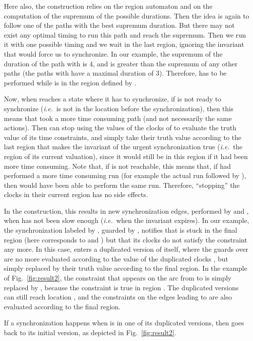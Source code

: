 \documentclass{LMCS}
\theoremstyle{plain}\newtheorem*{prop11}{Proposition~\ref{prop:states} bis}
\def\ie{{\em i.e.\ }}
\begin{document}
Here also, the construction relies on the region automaton and on the
computation of the supremum of the possible durations. Then the idea is again to
follow one of the paths with the best supremum duration. But there may not exist
any optimal timing to run this path and reach the supremum. Then we run it with
one possible timing and we wait in the last region, ignoring the invariant that
would force us to synchronize.
In our example, the supremum of the duration of the path
with  is 4, and is greater than the supremum
of any other paths (the paths with  have a maximal duration of 3).
Therefore,  has to be performed while  is in the region defined by
.


Now, when  reaches a state where it has to synchronize, if
 is not ready to synchronize (\ie  is not in the location
before the synchronization), then this means that  took
a more time consuming path (and not necessarily the same actions).
Then  can stop using the values of the clocks of  to
evaluate the truth value of its time constraints, and simply take their truth value according to the last region that makes
the invariant of the urgent synchronization true (\ie the region of its current
valuation), since it would still be in this region if it had been more time consuming.
Note that, if  is not reachable, this means that, if  had
performed a more time consuming run (for example the actual run followed by ),
then  would have been able to perform the same run.
Therefore, ``stopping'' the clocks in their current region has no
side effects.


In the construction, this results in new synchronization edges, performed
by  and , when  has not been
slow enough (\ie when the invariant expires).
In our example, the synchronization labeled by ,
guarded by , notifies  that 
is stuck in the final region  (here  corresponds to  and ) but that its clocks do not satisfy the constraint any more.
In this case,  enters a duplicated version of itself, where
the guards over  are no more evaluated according to the value of the
duplicated clocks , but simply replaced by their truth value according
to the final region.
In the example of Fig.~\ref{fig:result2}, the constraint  that
appears on the arc from  to  is simply replaced by ,
because the constraint is true in region .
The duplicated versions can still reach location
,
and the constraints on the edges leading to  are also evaluated
according to the final region.

If a synchronization happens when  is in one of its
duplicated versions,
then  goes back to its initial version,
as depicted in Fig.~\ref{fig:result2}.
\end{document}
